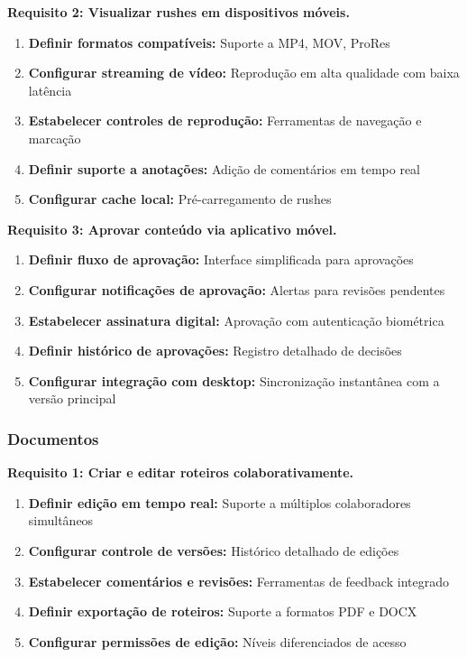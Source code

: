 \textbf{Requisito 2: Visualizar rushes em dispositivos móveis.}
\begin{enumerate}[leftmargin=*]
    \item \textbf{Definir formatos compatíveis:} Suporte a MP4, MOV, ProRes
    \item \textbf{Configurar streaming de vídeo:} Reprodução em alta qualidade com baixa latência
    \item \textbf{Estabelecer controles de reprodução:} Ferramentas de navegação e marcação
    \item \textbf{Definir suporte a anotações:} Adição de comentários em tempo real
    \item \textbf{Configurar cache local:} Pré-carregamento de rushes
\end{enumerate}

\textbf{Requisito 3: Aprovar conteúdo via aplicativo móvel.}
\begin{enumerate}[leftmargin=*]
    \item \textbf{Definir fluxo de aprovação:} Interface simplificada para aprovações
    \item \textbf{Configurar notificações de aprovação:} Alertas para revisões pendentes
    \item \textbf{Estabelecer assinatura digital:} Aprovação com autenticação biométrica
    \item \textbf{Definir histórico de aprovações:} Registro detalhado de decisões
    \item \textbf{Configurar integração com desktop:} Sincronização instantânea com a versão principal
\end{enumerate}

\subsubsection{Documentos}
\textbf{Requisito 1: Criar e editar roteiros colaborativamente.}
\begin{enumerate}[leftmargin=*]
    \item \textbf{Definir edição em tempo real:} Suporte a múltiplos colaboradores simultâneos
    \item \textbf{Configurar controle de versões:} Histórico detalhado de edições
    \item \textbf{Estabelecer comentários e revisões:} Ferramentas de feedback integrado
    \item \textbf{Definir exportação de roteiros:} Suporte a formatos PDF e DOCX
    \item \textbf{Configurar permissões de edição:} Níveis diferenciados de acesso
\end{enumerate}

